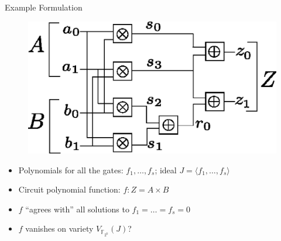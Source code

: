 \documentclass[xcolor=dvipsnames]{beamer}
\newcommand{\Fkk}{{\mathbb{F}}_{2^k}}
\begin{document}
\begin{frame}{\large {Example Formulation}}

\begin{figure}[hbt]
\centerline{
\includegraphics[scale=0.4]{2bitmult.eps}
}
\label{fig:mult-2-bit}
\end{figure}

\begin{itemize}
\item Polynomials for all the gates: $f_1, \dots, f_s$; ideal $J =
  \langle f_1, \dots, f_s\rangle$
\item Circuit polynomial function: $f: Z = A\times B$
\item $f$ ``agrees with'' all solutions to $f_1 = \dots = f_s = 0$
\item $f$ vanishes on variety $V_{\Fkk}(J)$?
\end{itemize}

\end{frame}






\end{document}
